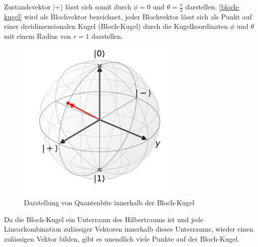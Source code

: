 Zustandsvektor $|+\rangle$ l\"asst sich somit durch $\phi= 0$ und $\theta = \frac{\pi}{2}$ darstellen. \ref{bloch-kugel} wird als Blochvektor bezeichnet, jeder Blochvektor l\"asst sich als Punkt auf einer dreidimensionalen Kugel (Bloch-Kugel) durch die Kugelkoordinaten $\phi$ und $\theta$ mit einem Radius von $r = 1$ darstellen.
\begin{figure}[h]
\centering
\includegraphics[width=0.7\textwidth]{figures/blochsphere.pdf}
\caption{Darstellung von Quantenbits innerhalb der Bloch-Kugel}
\end{figure}
Da die Bloch-Kugel ein Unterraum des Hilbertraums ist und jede Linearkombination zul\"assiger Vektoren innerhalb dieses Unterraums, wieder einen zul\"assigen Vektor bilden, gibt es unendlich viele Punkte auf der Bloch-Kugel.
